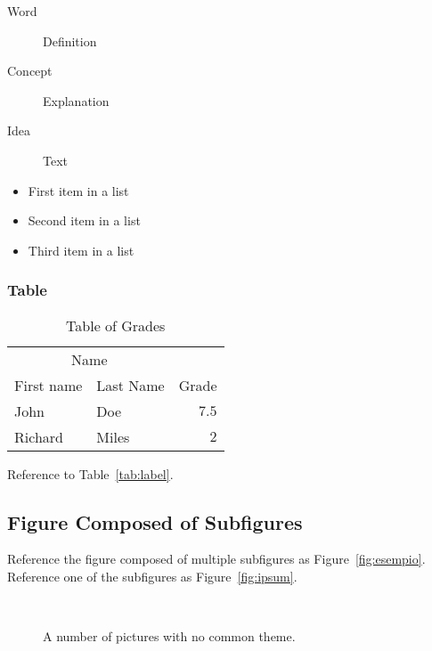 \documentclass[
10pt, %
a4paper, %
oneside, %
headinclude,footinclude, %
BCOR5mm, %
]{scrartcl}
\begin{document}
\begin{description}
\item[Word] Definition
\item[Concept] Explanation
\item[Idea] Text
\end{description}

\lipsum[12] %

\begin{itemize}[noitemsep] %
\item First item in a list
\item Second item in a list
\item Third item in a list
\end{itemize}

\subsubsection{Table}

\lipsum[13] %

\begin{table}[hbt]
\caption{Table of Grades}
\centering
\begin{tabular}{llr}
\toprule
\multicolumn{2}{c}{Name} \\
\cmidrule(r){1-2}
First name & Last Name & Grade \\
\midrule
John & Doe & $7.5$ \\
Richard & Miles & $2$ \\
\bottomrule
\end{tabular}
\label{tab:label}
\end{table}

Reference to Table~\vref{tab:label}. %


\subsection{Figure Composed of Subfigures}

Reference the figure composed of multiple subfigures as Figure~\vref{fig:esempio}. Reference one of the subfigures as Figure~\vref{fig:ipsum}. %

\lipsum[15-18] %

\begin{figure}[tb]
\centering
{} \quad
{} \\
 \quad
{}
\caption[A number of pictures.]{A number of pictures with no common theme.} %
\label{fig:esempio}
\end{figure}
\end{document}
